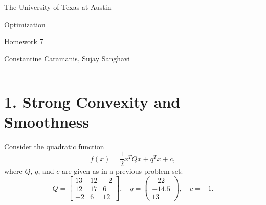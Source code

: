 \documentclass{article}
\begin{document}
\begin{center}
{\large The University of Texas at Austin}

{\large Optimization}

\vspace{1cm}

{\large Homework 7}

\vspace{1cm}

Constantine Caramanis, Sujay Sanghavi

\vspace{0.5cm}
\hrule
\end{center}

\section*{1. Strong Convexity and Smoothness} Consider the quadratic function
\[
f(x) = \frac{1}{2}x^TQx + q^Tx + c,
\]
where $Q$, $q$, and $c$ are given as in a previous problem set:
\[
Q = \begin{bmatrix}
13 & 12 & -2 \\
12 & 17 & 6 \\
-2 & 6 & 12
\end{bmatrix}, \quad
q = \begin{pmatrix}
-22 \\
-14.5 \\
13
\end{pmatrix}, \quad
c = -1.
\]
\end{document}
